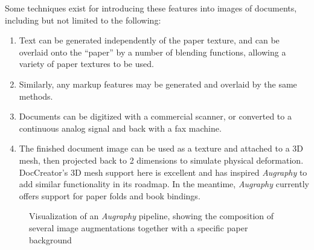\documentclass[runningheads]{llncs}
\begin{document}
Some techniques exist for introducing these features into images of documents, including but not limited to the following:
\begin{enumerate}
\item Text can be generated independently of the paper texture, and can be overlaid onto the ``paper'' by a number of blending functions, allowing a variety of paper textures to be used.
\item Similarly, any markup features may be generated and overlaid by the same methods.
\item Documents can be digitized with a commercial scanner, or converted to a continuous analog signal and back with a fax machine.
\item The finished document image can be used as a texture and attached to a 3D mesh, then projected back to 2 dimensions to simulate physical deformation. DocCreator's 3D mesh support here is excellent and has inspired \emph{Augraphy} to add similar functionality in its roadmap. In the meantime, \emph{Augraphy} currently offers support for paper folds and book bindings.
\end{enumerate}


\begin{figure}
\centering
{}
\caption{Visualization of an \emph{Augraphy} pipeline, showing the composition of several image augmentations together with a specific paper background}
\label{fig:pipeline}
\end{figure}
\end{document}
